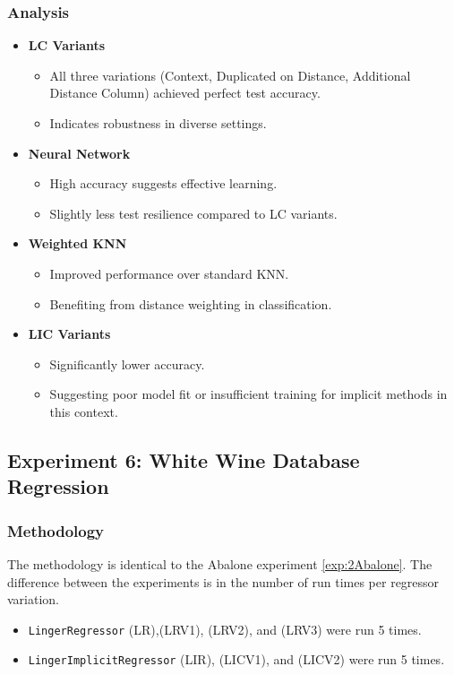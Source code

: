 \documentclass[a4paper, 12pt]{report}
\begin{document}
\subsubsection{Analysis}
\begin{itemize}
    \item \textbf{LC Variants}
    \begin{itemize}
        \item All three variations (Context, Duplicated on Distance, Additional Distance Column) achieved perfect test accuracy.
        \item Indicates robustness in diverse settings.
    \end{itemize}
    
    \item \textbf{Neural Network}
    \begin{itemize}
        \item High accuracy suggests effective learning.
        \item Slightly less test resilience compared to LC variants.
    \end{itemize}
    
    \item \textbf{Weighted KNN}
    \begin{itemize}
        \item Improved performance over standard KNN.
        \item Benefiting from distance weighting in classification.
    \end{itemize}

    \item \textbf{LIC Variants}
    \begin{itemize}
        \item Significantly lower accuracy.
        \item Suggesting poor model fit or insufficient training for implicit methods in this context.
    \end{itemize}
\end{itemize}

\subsection{Experiment 6: White Wine Database Regression}
\subsubsection{Methodology}
The methodology is identical to the Abalone experiment \ref{exp:2Abalone}. 
The difference between  the experiments is in the number of run times per regressor variation.
\begin{itemize}
    \item \texttt{LingerRegressor} (LR),(LRV1), (LRV2), and (LRV3) were run 5 times.
    \item \texttt{LingerImplicitRegressor} (LIR), (LICV1), and (LICV2) were run 5 times.
\end{itemize}
\end{document}

